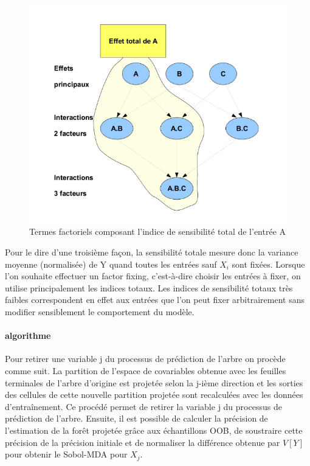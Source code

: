 \documentclass[
]{article}
\begin{document}
\begin{figure}
\centering
\includegraphics{effetsTotaux.png}
\caption{Termes factoriels composant l'indice de sensibilité total de
l'entrée A}
\end{figure}

Pour le dire d'une troisième façon, la sensibilité totale mesure donc la
variance moyenne (normalisée) de Y quand toutes les entrées sauf \(X_i\)
sont fixées. Lorsque l'on souhaite effectuer un factor fixing,
c'est-à-dire choisir les entrées à fixer, on utilise principalement les
indices totaux. Les indices de sensibilité totaux très faibles
correspondent en effet aux entrées que l'on peut fixer arbitrairement
sans modifier sensiblement le comportement du modèle.

\hypertarget{algorithme}{%
\paragraph{algorithme}\label{algorithme}}

Pour retirer une variable j du processus de prédiction de l'arbre on
procède comme suit. La partition de l'espace de covariables obtenue avec
les feuilles terminales de l'arbre d'origine est projetée selon la
j-ième direction et les sorties des cellules de cette nouvelle partition
projetée sont recalculées avec les données d'entraînement. Ce procédé
permet de retirer la variable j du processus de prédiction de l'arbre.
Ensuite, il est possible de calculer la précision de l'estimation de la
forêt projetée grâce aux échantillons OOB, de soustraire cette précision
de la précision initiale et de normaliser la différence obtenue par
\(V [Y ]\) pour obtenir le Sobol-MDA pour \(X_j\).
\end{document}
